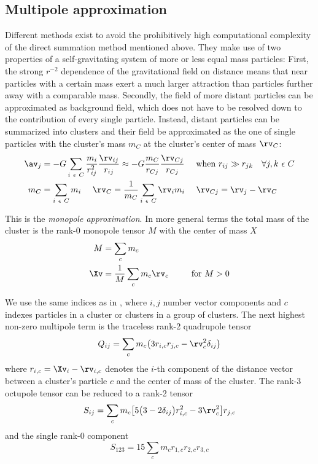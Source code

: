 \subsection{Multipole approximation}
Different methods exist to avoid the prohibitively high computational complexity of the direct summation method mentioned above.  They make use of two properties of a self-gravitating system of more or less equal mass particles: First, the strong $r^{-2}$ dependence of the gravitational field on distance means that near particles with a certain mass exert a much larger attraction than particles further away with a comparable mass. Secondly, the field of more distant particles can be approximated as background field, which does not have to be resolved down to the contribution of every single particle. Instead, distant particles can be summarized into clusters and their field be approximated as the one of single particles with the cluster's mass $m_C$ at the cluster's center of mass $\rv_C$:
\begin{align}
\label{ch02_grav02_eq001}
\av_j &= - G \sum_{i~\epsilon~C} \frac{m_i}{r_{ij}^2} \frac{\rv_{ij}}{r_{ij}} \approx - G \frac{m_{C}}{r_{Cj}} \frac{\rv_{Cj}}{r_{Cj}} ~~~~ \text{when}~r_{ij} \gg r_{jk} ~~~ \forall j,k ~ \epsilon~C \\
m_C &= \sum_{i~\epsilon~C} m_i ~~~~ \rv_C = \frac{1}{m_C} \sum_{i~\epsilon~C} \rv_i m_i ~~~~ \rv_{Cj} = \rv_j - \rv_C 
\end{align}

This is the \emph{monopole approximation}. In more general terms the total mass of the cluster is the rank-0 monopole tensor $M$ with the center of mass $X$
\begin{align}
\label{ch02_grav02_eq002}
M & = \sum_{c} m_{c} \\
\Xv  & = \frac{1}{M} \sum_{c} m_{c} \rv_{c} ~~~~~~~~ \text{for}~M > 0
\end{align}

We use the same indices as in \cite{McMillan:1993p43}, where $i,j$ number vector components and $c$ indexes particles in a cluster or clusters in a group of clusters. The next highest non-zero multipole term is the traceless rank-2 quadrupole tensor
\begin{equation}
\label{ch02_grav02_eq003}
Q_{ij} = \sum_{c} m_c \big( 3 r_{i, c} r_{j, c} - \rv_{c}^2 \delta_{i j} \big) \\
\end{equation}
where $r_{i,c} = \Xv_i - \rv_{i,c}$ denotes the $i$-th component of the distance vector between a cluster's particle $c$ and the center of mass of the cluster. The rank-3 octupole tensor can be reduced to a rank-2 tensor 
\begin{equation}
\label{ch02_grav02_eq004}
S_{ij}  = \sum_{c} m_c \big[ 5 \big( 3 - 2  \delta_{i j} \big) r_{i, c}^2 - 3 \rv_{c}^2 \big] r_{j, c}\\
\end{equation}
and the single rank-0 component
\begin{equation}
\label{ch02_grav02_eq005}
S_{1 2 3} = 15 \sum_{c} m_c r_{1, c} r_{2, c} r_{3, c}
\end{equation}

